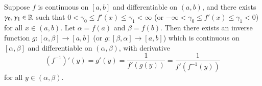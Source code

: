 \begin{theorem}
    Suppose $f$ is continuous on $[a,b]$ and differentiable on $(a,b)$, and there exists $\gamma_0,\gamma_1 \in \mathbb R$ such that $0 < \gamma_0 \leq f'(x) \leq \gamma_1 < \infty$ (or $-\infty < \gamma_0 \leq f'(x) \leq \gamma_1 < 0$) for all $x \in (a,b)$. Let $\alpha = f(a)$ and $\beta = f(b)$. Then there exists an inverse function $g:[\alpha,\beta]\rightarrow [a,b]$ (or $g:[\beta,\alpha]\rightarrow[a,b]$) which is continuous on $[\alpha,\beta]$ and differentiable on $(\alpha,\beta)$, with derivative \begin{equation*}
        (f^{-1})'(y) = g'(y) = \frac{1}{f'(g(y))} = \frac{1}{f'(f^{-1}(y))}
    \end{equation*}
    for all $y \in (\alpha,\beta)$.
\end{theorem}
